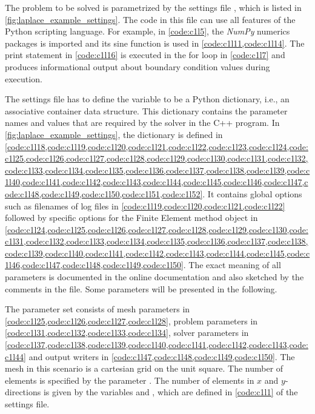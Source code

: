 The problem to be solved is parametrized by the settings file , which is listed in \cref{fig:laplace_example_settings}. The code in this file can use all features of the Python scripting language. For example, in \cref{code:c1l5}, the \emph{NumPy} numerics packages is imported and its sine function is used in \cref{code:c1l11,code:c1l14}. The print statement in \cref{code:c1l16} is executed in the for loop in \cref{code:c1l7} and produces informational output about boundary condition values during execution. 

The settings file has to define the variable  to be a Python dictionary, i.e., an associative container data structure. This dictionary contains the parameter names and values that are required by the solver in the C++ program. 
In \cref{fig:laplace_example_settings}, the  dictionary is defined in \cref{code:c1l18,code:c1l19,code:c1l20,code:c1l21,code:c1l22,code:c1l23,code:c1l24,code:c1l25,code:c1l26,code:c1l27,code:c1l28,code:c1l29,code:c1l30,code:c1l31,code:c1l32,code:c1l33,code:c1l34,code:c1l35,code:c1l36,code:c1l37,code:c1l38,code:c1l39,code:c1l40,code:c1l41,code:c1l42,code:c1l43,code:c1l44,code:c1l45,code:c1l46,code:c1l47,code:c1l48,code:c1l49,code:c1l50,code:c1l51,code:c1l52}. It contains global options such as filenames of log files in \cref{code:c1l19,code:c1l20,code:c1l21,code:c1l22} followed by specific options for the Finite Element method object in \cref{code:c1l24,code:c1l25,code:c1l26,code:c1l27,code:c1l28,code:c1l29,code:c1l30,code:c1l31,code:c1l32,code:c1l33,code:c1l34,code:c1l35,code:c1l36,code:c1l37,code:c1l38,code:c1l39,code:c1l40,code:c1l41,code:c1l42,code:c1l43,code:c1l44,code:c1l45,code:c1l46,code:c1l47,code:c1l48,code:c1l49,code:c1l50}. The exact meaning of all parameters is documented in the online documentation \cite{opendihuWeb} and also sketched by the comments in the file. Some parameters will be presented in the following.

The parameter set consists of mesh parameters in \cref{code:c1l25,code:c1l26,code:c1l27,code:c1l28}, problem parameters in \cref{code:c1l31,code:c1l32,code:c1l33,code:c1l34}, 
solver parameters in \cref{code:c1l37,code:c1l38,code:c1l39,code:c1l40,code:c1l41,code:c1l42,code:c1l43,code:c1l44} and output writers in \cref{code:c1l47,code:c1l48,code:c1l49,code:c1l50}. 
The mesh in this scenario is a cartesian grid on the unit square. The number of elements is specified by the parameter . The number of elements in $x$ and $y$-directions is given by the variables  and , which are defined in \cref{code:c1l1} of the settings file. 

